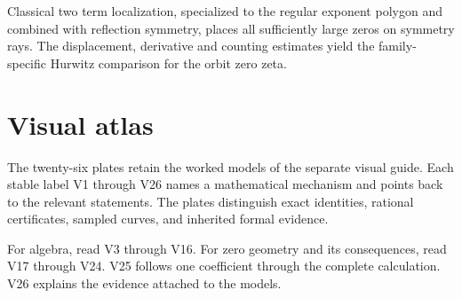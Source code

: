 \documentclass[11pt,letterpaper]{article}
\theoremstyle{definition}
\theoremstyle{remark}
\begin{document}
Classical two term localization, specialized to the regular exponent polygon
and combined with reflection symmetry, places all sufficiently large zeros
on symmetry rays. The displacement, derivative and counting estimates yield
the family-specific Hurwitz comparison for the orbit zero zeta.

\begingroup
\small
\let\prscbibliography\thebibliography
\renewcommand{\thebibliography}[1]{\prscbibliography{#1}\setlength{\itemsep}{0pt}\setlength{\parsep}{0pt}}


\endgroup

\clearpage
\appendix
\section{Visual atlas}\label{app:visual-atlas}
The twenty-six plates retain the worked models of the separate visual guide. Each stable label V1 through V26 names a mathematical mechanism and points back to the relevant statements. The plates distinguish exact identities, rational certificates, sampled curves, and inherited formal evidence.
\begin{readerroadmap}[title={Three routes through the atlas}]
For algebra, read V3 through V16. For zero geometry and its consequences, read V17 through V24. V25 follows one coefficient through the complete calculation. V26 explains the evidence attached to the models.
\end{readerroadmap}
\clearpage
\begingroup
\fontsize{10}{12}\selectfont\setlength{\parskip}{4pt}
\setlength{\abovedisplayskip}{6pt}\setlength{\belowdisplayskip}{6pt}

\endgroup
\end{document}
